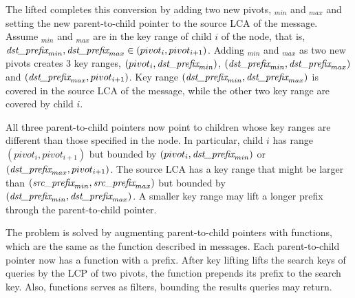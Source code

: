 The lifted \bedag completes this conversion by adding two new pivots,
\dpre$_{min}$ and \dpre$_{max}$ and
setting the new parent-to-child pointer to the source LCA of the
\goto message.
Assume \dpre$_{min}$ and \dpre$_{max}$ are in the key range of child $i$ of the node,
that is, $\textit{dst\_prefix}_{min}, \textit{dst\_prefix}_{max} \in (pivot_{i},pivot_{i+1})$.
Adding \dpre$_{min}$ and \dpre$_{max}$ as two new pivots creates 3 key ranges,
$(pivot_{i},\textit{dst\_prefix}_{min})$, $(\textit{dst\_prefix}_{min},\textit{dst\_prefix}_{max})$ and
$(\textit{dst\_prefix}_{max}, pivot_{i+1})$.
Key range $(\textit{dst\_prefix}_{min},\textit{dst\_prefix}_{max})$ is covered in the source LCA of the \goto
message, while the other two key range are covered by child $i$.

All three parent-to-child pointers now point to children whose key
ranges are different than those specified in the node.
In particular, child $i$ has range $(pivot_{i},pivot_{i+1})$ but bounded by
$(pivot_{i},\textit{dst\_prefix}_{min})$ or $(\textit{dst\_prefix}_{max}, pivot_{i+1})$.
The source LCA has a key range that might be larger than
$(\textit{src\_prefix}_{min}, \textit{src\_prefix}_{max})$ but bounded by $(\textit{dst\_prefix}_{min},\textit{dst\_prefix}_{max})$.
A smaller key range may lift a longer prefix through the parent-to-child
pointer.

The problem is solved by augmenting parent-to-child pointers with \xf functions,
which are the same as the \xf function described in \goto messages.
Each parent-to-child pointer now has a \xf function with a prefix.
After key lifting lifts the search keys of queries by the LCP of two pivots,
the \xf function prepends its prefix to the search key.
Also, \xf functions serves as filters, bounding the results queries may return.


